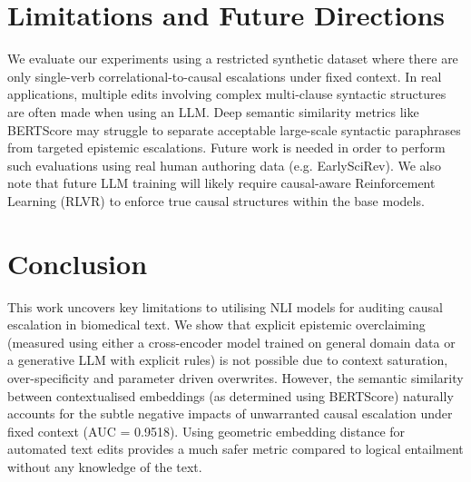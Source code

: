 \documentclass[acmsmall]{acmart}
\begin{document}
\section{Limitations and Future Directions}

We evaluate our experiments using a restricted synthetic dataset where there are only single-verb correlational-to-causal escalations under fixed context. In real applications, multiple edits involving complex multi-clause syntactic structures are often made when using an LLM. Deep semantic similarity metrics like BERTScore may struggle to separate acceptable large-scale syntactic paraphrases from targeted epistemic escalations. Future work is needed in order to perform such evaluations using real human authoring data (e.g. EarlySciRev). We also note that future LLM training will likely require causal-aware Reinforcement Learning (RLVR) to enforce true causal structures within the base models.

\section{Conclusion}

This work uncovers key limitations to utilising NLI models for auditing causal escalation in biomedical text. We show that explicit epistemic overclaiming (measured using either a cross-encoder model trained on general domain data or a generative LLM with explicit rules) is not possible due to context saturation, over-specificity and parameter driven overwrites. However, the semantic similarity between contextualised embeddings (as determined using BERTScore) naturally accounts for the subtle negative impacts of unwarranted causal escalation under fixed context (AUC = 0.9518). Using geometric embedding distance for automated text edits provides a much safer metric compared to logical entailment without any knowledge of the text.



\end{document}
